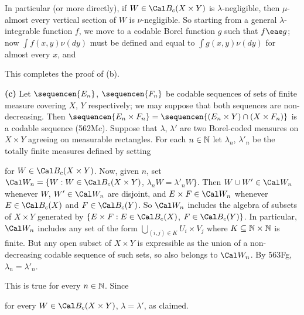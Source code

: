 {\medskip

 In particular (or more directly), if
$W\in\Cal B_c(X\times Y)$ is $\lambda$-negligible,
then $\mu$-almost every vertical section of $W$ is $\nu$-negligible.   So
starting from a general $\lambda$-integrable function $f$, we move to a
codable Borel function $g$ such that $f\eae g$;  now
$\int f(x,y)\nu(dy)$ must be defined and equal to $\int g(x,y)\nu(dy)$ for
almost every $x$, and


\noindent This completes the proof of (b).

\medskip

{\bf (c)} Let $\sequencen{E_n}$, $\sequencen{F_n}$ be codable sequences of
sets of finite measure covering $X$, $Y$ respectively;  we may suppose that
both sequences are non-decreasing.   Then
$\sequencen{E_n\times F_n}=\sequencen{(E_n\times Y)\cap(X\times F_n)}$ is a
codable sequence (562Mc).   Suppose that
$\lambda$, $\lambda'$ are two Borel-coded measures on $X\times Y$ agreeing
on measurable rectangles.
For each $n\in\Bbb N$ let $\lambda_n$, $\lambda'_n$ be
the totally finite measures defined by setting


\noindent for $W\in\Cal B_c(X\times Y)$.   Now, given $n$, set
$\Cal W_n=\{W:W\in\Cal B_c(X\times Y)$, $\lambda_nW=\lambda'_nW\}$.
Then $W\cup W'\in\Cal W_n$ whenever $W$, $W'\in\Cal W_n$ are disjoint,
and $E\times F\in\Cal W_n$ whenever $E\in\Cal B_c(X)$ and
$F\in\Cal B_c(Y)$.   So $\Cal W_n$ includes the algebra of subsets of
$X\times Y$ generated by
$\{E\times F:E\in\Cal B_c(X)$, $F\in\Cal B_c(Y)\}$.
In particular, $\Cal W_n$ includes any
set of the form $\bigcup_{(i,j)\in K}U_i\times V_j$ where
$K\subseteq\Bbb N\times\Bbb N$ is finite.   But any open subset of
$X\times Y$ is expressible as the union of a non-decreasing
codable sequence of such sets,
so also belongs to $\Cal W_n$.   By 563Fg, $\lambda_n=\lambda'_n$.

This is true for every $n\in\Bbb N$.   Since


\noindent for every $W\in\Cal B_c(X\times Y)$, $\lambda=\lambda'$, as
claimed.
}%

